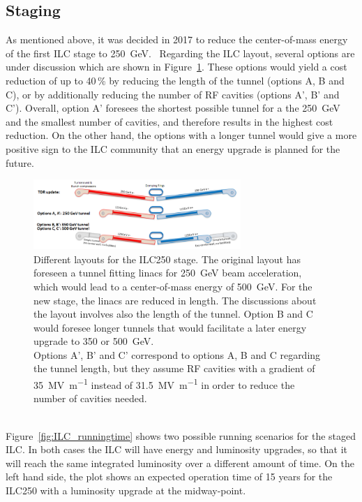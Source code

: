 \subsection{Staging}
As mentioned above, it was decided in 2017 to reduce the center-of-mass energy of the first ILC stage to \SI{250}{\GeV}.~\cite{ICFA_Statement}
Regarding the ILC layout, several options are under discussion which are shown in Figure~\ref{fig:Staging}.
These options would yield a cost reduction of up to 40\,\% by reducing the length of the tunnel (options A, B and C), or by additionally reducing the number of RF cavities (options A', B' and C').
Overall, option A' foresees the shortest possible tunnel for a the \SI{250}{\GeV} and the smallest number of cavities, and therefore results in the highest cost reduction.
On the other hand, the options with a longer tunnel would give a more positive sign to the ILC community that an energy upgrade is planned for the future.
\begin{figure}[h]
\centering
\includegraphics[width=0.7\textwidth]{Figures/Staging.png}
\caption[Different layouts for the ILC250 stage]{Different layouts for the ILC250 stage.
The original layout has foreseen a tunnel fitting linacs for \SI{250}{\GeV} beam acceleration, which would lead to a center-of-mass energy of \SI{500}{\GeV}.
For the new stage, the linacs are reduced in length.
The discussions about the layout involves also the length of the tunnel.
Option B and C would foresee longer tunnels that would facilitate a later energy upgrade to 350 or \SI{500}{\GeV}.\\
Options A', B' and C' correspond to options A, B and C regarding the tunnel length, but they assume RF cavities with a gradient of \SI{35}{\mega\volt\per\meter} instead of \SI{31.5}{\mega\volt\per\meter} in order to reduce the number of cavities needed.~\cite[p. 19]{Staging}}
\label{fig:Staging}
\end{figure}
\\Figure~\ref{fig:ILC_runningtime} shows two possible running scenarios for the staged ILC.
In both cases the ILC will have energy and luminosity upgrades, so that it will reach the same integrated luminosity over a different amount of time.
On the left hand side, the plot shows an expected operation time of 15 years for the ILC250 with a luminosity upgrade at the midway-point.
